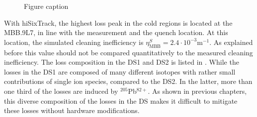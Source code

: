 


\begin{figure}[htbp]
  \centering
  \caption{Figure caption}  
  \label{pic:16071402}
  \end{figure}



With hiSixTrack, the highest loss peak in the cold regions is located at the MBB.9L7, in line with the measurement and the quench location. At this location, the simulated cleaning inefficiency is $\eta_\text{MBB}^S = 2.4 \cdot 10^{-3} \text{m}^{-1}$. As explained before this value should not be compared quantitatively to the measured cleaning inefficiency. The loss composition in the DS1 and DS2 is listed in \tabref{}. While the losses in the DS1 are composed of many different isotopes with rather small contributions of single ion species, compared to the DS2. In the latter, more than one third of the losses are induced by $^{205}$Pb$^{82+}$. As shown in previous chapters, this diverse composition of the losses in the DS makes it difficult to mitigate these losses without hardware modifications. 


